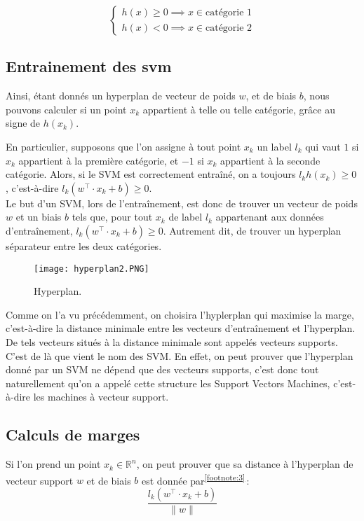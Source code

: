 \documentclass{article}
\begin{document}
\[ \begin{cases}
h(x) \geq 0  \implies x \in \text{catégorie 1} \\
h(x) < 0 \implies x \in \text{catégorie 2}
\end{cases} \]

\vspace{5mm} %
\subsection{Entrainement des svm}
\vspace{5mm} %
Ainsi, étant donnés un hyperplan de vecteur de poids $w$, et de biais $b$, nous pouvons calculer si un point $x_k$ appartient à telle ou telle catégorie, grâce au signe de $h(x_k)$.



En particulier, supposons que l’on assigne à tout point $x_k$ un label $l_k$ qui vaut $1$ si $x_k$ appartient à la première catégorie, et $-1$ si $x_k$ appartient à la seconde catégorie. Alors, si le SVM est correctement entraîné, on a toujours $l_k h(x_k) \geq 0$, c’est-à-dire $l_k (w^\top \cdot x_k+b)\geq0$. \\
Le but d’un SVM, lors de l’entraînement, est donc de trouver un vecteur de poids $w$ et un biais $b$ tels que, pour tout $x_k$ de label $l_k$ appartenant aux données d’entraînement, $l_k (w^\top \cdot x_k+b)\geq 0$. Autrement dit, de trouver un hyperplan séparateur entre les deux catégories.
\vspace{5mm} %
\begin{figure}[b!]
  \texttt{[image: hyperplan2.PNG]}
  \caption{Hyperplan.}
  \label{fig5:SVM}
\end{figure}
\vspace{5mm} %

Comme on l’a vu précédemment, on choisira l’hyplerplan qui maximise la marge, c’est-à-dire la distance minimale entre les vecteurs d’entraînement et l’hyperplan. De tels vecteurs situés à la distance minimale sont appelés vecteurs supports.
\vspace{5mm} %
C’est de là que vient le nom des SVM. En effet, on peut prouver que l’hyperplan donné par un SVM ne dépend que des vecteurs supports, c’est donc tout naturellement qu’on a appelé cette structure les Support Vectors Machines, c’est-à-dire les machines à vecteur support.
\vspace{5mm} %
\subsection{Calculs de marges}
\vspace{5mm} %
Si l’on prend un point $x_k \in \mathbb{R}^n$, on peut prouver que sa distance à l’hyperplan de vecteur support $w$ et de biais $b$ est donnée par\textsuperscript{\ref{footnote:3}} :
$$\frac{l_k (w^\top \cdot x_k+b)}{\|w\|}$$
\end{document}
